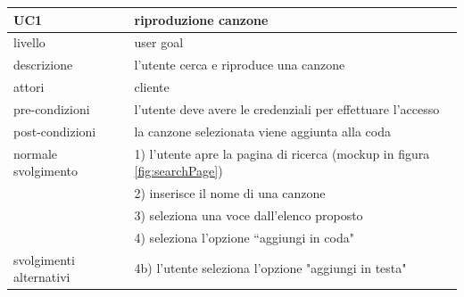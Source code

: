\documentclass{article}
\begin{document}
  \begin{table}[H]
    \centering
    \begin{tabular}{|l|l|}
      \hline
      \textbf{UC1}            & \textbf{riproduzione canzone}                                                 \\
      \hline
      livello                 & user goal                                                                     \\
      \hline
      descrizione             & l'utente cerca e riproduce una canzone                                        \\
      \hline
      attori                  & cliente                                                                       \\
      \hline
      pre-condizioni          & l'utente deve avere le credenziali per effettuare l'accesso                   \\
      \hline
      post-condizioni         & la canzone selezionata viene aggiunta alla coda                               \\
      \hline
      normale svolgimento     & 1) l'utente apre la pagina di ricerca (mockup in figura \ref{fig:searchPage}) \\
      & 2) inserisce il nome di una canzone                                           \\
      & 3) seleziona una voce dall'elenco proposto                                    \\
      & 4) seleziona l'opzione ``aggiungi in coda"

      \\
      \hline
      svolgimenti alternativi & 4b) l'utente seleziona l'opzione "aggiungi in testa"                          \\
      \hline
    \end{tabular}
    \label{tab:uct1}
  \end{table}

  \vspace{40pt}
\end{document}
